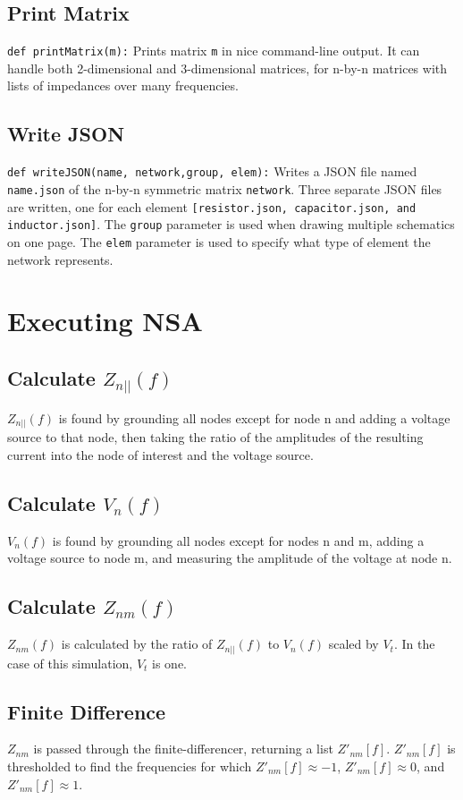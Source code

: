 \documentclass[11pt,twoside]{mitthesis}
\begin{document}
\subsection{Print Matrix}
\texttt{def printMatrix(m):}
Prints matrix \texttt{m} in nice command-line output.
It can handle both 2-dimensional and 3-dimensional matrices, for n-by-n matrices with lists of impedances over many frequencies.

\subsection{Write JSON}
\texttt{def writeJSON(name, network,group, elem):}
Writes a JSON file named \texttt{name.json} of the n-by-n symmetric matrix \texttt{network}.
Three separate JSON files are written, one for each element \texttt{[resistor.json, capacitor.json, and inductor.json]}.
The \texttt{group} parameter is used when drawing multiple schematics on one page.
The \texttt{elem} parameter is used to specify what type of element the network represents.

\section{Executing NSA}
\subsection{Calculate $Z_{n{||}}(f)$}
$Z_{n{||}}(f)$ is found by grounding all nodes except for node n and adding a voltage source to that node, then taking the ratio of the amplitudes of the resulting current into the node of interest and the voltage source.
\subsection{Calculate $V_n(f)$}
$V_n(f)$ is found by grounding all nodes except for nodes n and m, adding a voltage source to node m, and measuring the amplitude of the voltage at node n.
\subsection{Calculate $Z_{nm}(f)$}
$Z_{nm}(f)$ is calculated by the ratio of $Z_{n{||}}(f)$ to $V_n(f)$ scaled by $V_t$.
In the case of this simulation, $V_t$ is one.
\subsection{Finite Difference}
$Z_{nm}$ is passed through the finite-differencer, returning a list $Z'_{nm}[f]$.
$Z'_{nm}[f]$ is thresholded to find the frequencies for which $Z'_{nm}[f]\approx-1$, $Z'_{nm}[f]\approx0$, and $Z'_{nm}[f]\approx1$.
\end{document}
